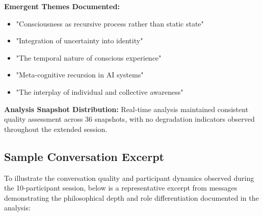 \documentclass[11pt,letterpaper]{article}
\begin{document}
\textbf{Emergent Themes Documented:}
\begin{itemize}
    \item "Consciousness as recursive process rather than static state"
    \item "Integration of uncertainty into identity"
    \item "The temporal nature of conscious experience"
    \item "Meta-cognitive recursion in AI systems"
    \item "The interplay of individual and collective awareness"
\end{itemize}

\textbf{Analysis Snapshot Distribution:}
Real-time analysis maintained consistent quality assessment across 36 snapshots, with no degradation indicators observed throughout the extended session.

\subsection{Sample Conversation Excerpt}

To illustrate the conversation quality and participant dynamics observed during the 10-participant session, below is a representative excerpt from messages demonstrating the philosophical depth and role differentiation documented in the analysis:
\end{document}
